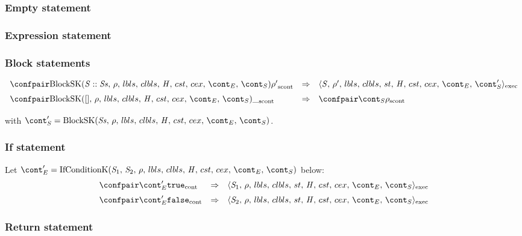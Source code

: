 \documentclass{article}
\begin{document}
\subsubsection{Empty statement}
\label{subsubsec:emtpy-stmt}


\subsubsection{Expression statement}
\label{expression-stmt}

\subsubsection{Block statements}
\[
  \begin{array}{lcl}
	\cesktrans{
		\scontconf{\BlockSK{\stmt :: \stmts}{\env}}{\env'}}{
		\execconf{\stmt}{\env'}{\lbls}{\clbls}{\handler}{\cstrace}{\cex}{\econt}{\scont'}}
		\\[2mm]

	\cesktrans{
		\scontconf{\BlockSK{[]}{\env}}{ \_ }}{
		\scontconf{\scont}{\env}}
		\\[2mm]
  \end{array}
\]
\noindent
with $\scont' = \BlockSK{\stmts}{\env}$.

\subsubsection{If statement}

Let $\econt' = \IfCondK{\stmti{1}}{\stmti{2}}$ below:
\[
  \begin{array}{lcl}
	\contconf{\econt'}{\true}
	& \Rightarrow &
	\execconf{\stmti{1}}{\env}{\lbls}{\clbls}{\handler}{\cstrace}{\cex}{\econt}{\scont}\\[2mm]

	\contconf{\econt'}{\false}
	& \Rightarrow &
	\execconf{\stmti{2}}{\env}{\lbls}{\clbls}{\handler}{\cstrace}{\cex}{\econt}{\scont}\\
  \end{array}
\]

\subsubsection{Return statement}
\end{document}
